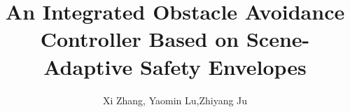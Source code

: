 %
% 



\setcounter{section}{0}
\title{An Integrated Obstacle Avoidance Controller Based on Scene-Adaptive Safety Envelopes}


\author{Xi Zhang, Yaomin Lu,Zhiyang Ju}

%


%

\maketitle
